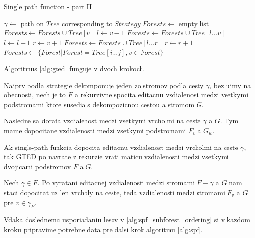 \begin{algorithm}
  \caption{Single path function - part II}
  \label{alg:spf_subforest_ordering}
  \begin{algorithmic}[1]
      \State $\gamma \gets$ path on $Tree$ corresponding to $Strategy$
      \State $Forests \gets$ empty list
        \State $Forests \gets Forests \cup Tree[v]$
        \State $l \gets v - 1$
          \State {}
          \State $Forests \gets Forests \cup Tree[l \dotsc v]$
          \State $l \gets l - 1$
        \EndWhile
        \State $r \gets v + 1$
          \State {}
          \State $Forests \gets Forests \cup Tree[l \dotsc r]$
          \State $r \gets r + 1$
        \EndWhile
      \EndFor
      \State $Forests \gets \{Forest | Forest = Tree[i \dotsc j], v \in Forest\}$
    \EndProcedure
  \end{algorithmic}
\end{algorithm}

Algoritmus \ref{alg:gted} funguje v dvoch krokoch.

Najprv podla strategie dekomponuje jeden zo stromov podla cesty $\gamma$,
bez ujmy na obecnosti, nech je to $F$ a rekurzivne spocita editacnu vzdialenost
medzi vsetkymi podstromami ktore susedia s dekompozicnou cestou a stromom $G$.

Nasledne sa dorata vzdialenost medzi vsetkymi vrcholmi na ceste $\gamma$ a $G$.
Tym mame dopocitane vzdialenosti medzi vsetkymi podstromami $F_{v}$ a $G_{w}$.

\begin{lemma}
  \label{lemma:gted}
  Ak single-path funkcia dopocita editacnu vzdialenost medzi vrcholmi
  na ceste $\gamma$, tak GTED po navrate z rekurzie vrati maticu vzdialenosti
  medzi vsetkymi dvojicami podstromov $F$ a $G$.
\end{lemma}

\begin{dukaz}
  \label{dukaz:gted}
  Nech $\gamma \in F$. Po vyratani editacnej vzdialenosti medzi stromami
  $F - \gamma$ a $G$ nam staci dopocitat uz len vrcholy na ceste,
  teda vzdialenosti medzi stromami $F_{v}$ a $G$ pre $v \in \gamma_{F}$.
\end{dukaz}

Vdaka doslednemu usporiadaniu lesov v \ref{alg:spf_subforest_ordering} si v kazdom
kroku pripravime potrebne data pre dalsi krok algoritmu \ref{alg:spf}.

